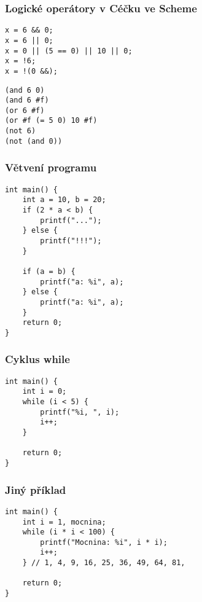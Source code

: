 \documentclass{beamer}
\newenvironment{itemizex}%
  {\large \begin{itemize}%
    \setlength{\itemsep}{8pt}%
    \setlength{\parskip}{8pt}}%
  {\end{itemize}}
\begin{document}



\begin{frame}[t,fragile]\frametitle{Logické operátory v Céčku ve Scheme} 
\begin{verbatim} 
x = 6 && 0;
x = 6 || 0;
x = 0 || (5 == 0) || 10 || 0;
x = !6;
x = !(0 &&);
\end{verbatim}

\begin{verbatim} 
(and 6 0)
(and 6 #f)
(or 6 #f)
(or #f (= 5 0) 10 #f)
(not 6)
(not (and 0))
\end{verbatim}
\end{frame}


\begin{frame}[t,fragile]\frametitle{Větvení programu} 
\begin{verbatim} 
int main() {
    int a = 10, b = 20;
    if (2 * a < b) {
        printf("...");
    } else {
        printf("!!!");
    }

    if (a = b) {
        printf("a: %i", a); 
    } else {
        printf("a: %i", a); 
    }
    return 0;
}
\end{verbatim}
\end{frame}


\begin{frame}[t,fragile]\frametitle{Cyklus while} 
\begin{verbatim} 
int main() {
    int i = 0;
    while (i < 5) {
        printf("%i, ", i);
        i++;
    }

    return 0;
}
\end{verbatim}
\end{frame}


\begin{frame}[t,fragile]\frametitle{Jiný příklad} 
\begin{verbatim} 
int main() {
    int i = 1, mocnina;
    while (i * i < 100) {
        printf("Mocnina: %i", i * i);
        i++;
    } // 1, 4, 9, 16, 25, 36, 49, 64, 81,

    return 0;
}
\end{verbatim}
\end{frame}
\end{document}

